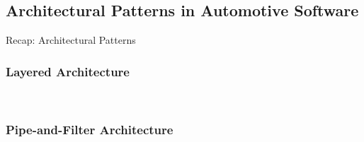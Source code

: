 
\subsection{Architectural Patterns in Automotive Software}
\begin{frame}{Recap: Architectural Patterns\ }
	\slideArchitecturalPattern
\end{frame}

\subsubsection{Layered Architecture}
\begin{frame}{\insertsubsubsection\ \mytitlesource{\staron}}
\end{frame}

\subsubsection{Pipe-and-Filter Architecture}
\begin{frame}{\insertsubsubsection\ \mytitlesource{\staron}}
\end{frame}


